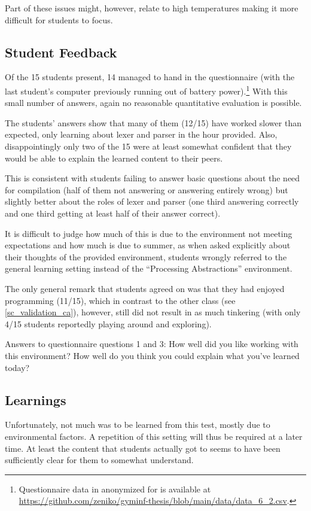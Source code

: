 Part of these issues might, however, relate to high temperatures making it more difficult for students to focus.


\subsection{Student Feedback}

Of the 15 students present, 14 managed to hand in the questionnaire (with the last student's computer previously running out of battery power).\footnote{Questionnaire data in anonymized for is available at \url{https://github.com/zeniko/gyminf-thesis/blob/main/data/data_6_2.csv}.} With this small number of answers, again no reasonable quantitative evaluation is possible.

The students' answers show that many of them (12/15) have worked slower than expected, only learning about lexer and parser in the hour provided. Also, disappointingly only two of the 15 were at least somewhat confident that they would be able to explain the learned content to their peers.

This is consistent with students failing to answer basic questions about the need for compilation (half of them not answering or answering entirely wrong) but slightly better about the roles of lexer and parser (one third answering correctly and one third getting at least half of their answer correct).

It is difficult to judge how much of this is due to the environment not meeting expectations and how much is due to summer, as when asked explicitly about their thoughts of the provided environment, students wrongly referred to the general learning setting instead of the ``Processing Abstractions'' environment.

The only general remark that students agreed on was that they had enjoyed programming (11/15), which in contrast to the other class (see \ref{sc_validation_ca}), however, still did not result in as much tinkering (with only 4/15 students reportedly playing around and exploring).

\begin{cfigure}{Answers to questionnaire questions 1 and 3: How well did you like working with this environment? How well do you think you could explain what you've learned today?}

\end{cfigure}


\subsection{Learnings}

Unfortunately, not much was to be learned from this test, mostly due to environmental factors. A repetition of this setting will thus be required at a later time. At least the content that students actually got to seems to have been sufficiently clear for them to somewhat understand.
